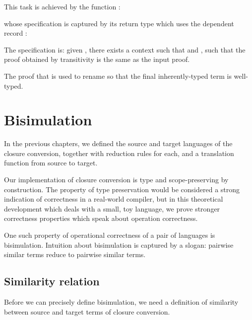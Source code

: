 \documentclass[bsc,frontabs,twoside,singlespacing,parskip,deptreport]{infthesis}
\theoremstyle{definition}
\begin{document}
This task is achieved by the function :


whose specification is captured by its return type which uses the
dependent record :


The specification is: given , there exists a context
 such that  and , such that the
proof  obtained by transitivity is the same as the input
proof.

The proof that  is used to rename  so that the
final inherently-typed term is well-typed.

\chapter{Bisimulation}

In the previous chapters, we defined the source and target languages
of the closure conversion, together with reduction rules for each, and
a translation function from source to target.

Our implementation of closure conversion is type and scope-preserving
by construction. The property of type preservation would be considered
a strong indication of correctness in a real-world compiler, but in
this theoretical development which deals with a small, toy language,
we prove stronger correctness properties which speak about operation
correctness.

One such property of operational correctness of a pair of languages is
bisimulation. Intuition about bisimulation is captured by a slogan:
pairwise similar terms reduce to pairwise similar terms. 

\section{Similarity relation}

Before we can precisely define
bisimulation, we need a definition of similarity between source
and target terms of closure conversion.

\end{document}
